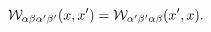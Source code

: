 \begin{equation}
{\cal W}_{\alpha\beta \alpha'\beta'}(x,x')={\cal
W}_{\alpha'\beta'\alpha\beta }(x',x) .
\end{equation}

